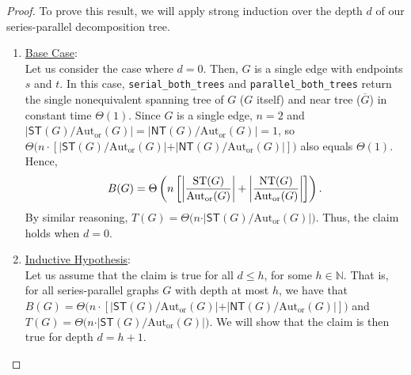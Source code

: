 \documentclass[10pt,a4paper]{amsart}
\begin{document}
\begin{proof}
    To prove this result, we will apply strong induction over the depth $d$ of our series-parallel decomposition tree.
    \vspace{5pt}
    \begin{enumerate}
        \item \underline{Base Case}:\\[6pt]
        Let us consider the case where $d = 0$. Then, $G$ is a single edge with endpoints $s$ and $t$. In this case, \texttt{serial\_both\_trees} and \texttt{parallel\_both\_trees} return the single nonequivalent spanning tree of $G$ ($G$ itself) and near tree ($\overline{G}$) in constant time $\Theta(1)$. Since $G$ is a single edge, $n = 2$ and $\vert \textsf{ST}(G)/\text{Aut}_\text{or}(G)\vert = \vert \textsf{NT}(G)/\text{Aut}_\text{or}(G)\vert = 1$, so $\Theta\big(n\cdot [\vert \textsf{ST}(G)/\text{Aut}_\text{or}(G)\vert + \vert \textsf{NT}(G)/\text{Aut}_\text{or}(G)\vert] \big)$ also equals $\Theta(1)$. Hence,
        \[B(G) = \Theta\left(n\left[\left\vert \frac{\text{\textsf{ST}}(G)}{\text{Aut}_\text{or}(G)}\right\vert + \left\vert \frac{\text{\textsf{NT}}(G)}{\text{Aut}_\text{or}(G)}\right\vert\right]\right).\]
        By similar reasoning, $T(G) = \Theta\big(n\cdot \vert \textsf{ST}(G) / \text{Aut}_\text{or}(G)\vert\big)$. Thus, the claim holds when $d = 0$.\\
        \item \underline{Inductive Hypothesis}:\\[6pt]
        Let us assume that the claim is true for all $d \leq h$, for some $h \in \mathbb{N}$. That is, for all series-parallel graphs $G$ with depth  at most $h$, we have that $B(G) = \Theta\big(n\cdot [\vert \textsf{ST}(G)/\text{Aut}_\text{or}(G)\vert + \vert \textsf{NT}(G)/\text{Aut}_\text{or}(G)\vert]\big)$ and $T(G) = \Theta\big(n\cdot \vert \textsf{ST}(G)/\text{Aut}_\text{or}(G)\vert\big)$. We will show that the claim is then true for depth $d = h + 1$.\\


\end{enumerate}
\end{proof}
\end{document}
